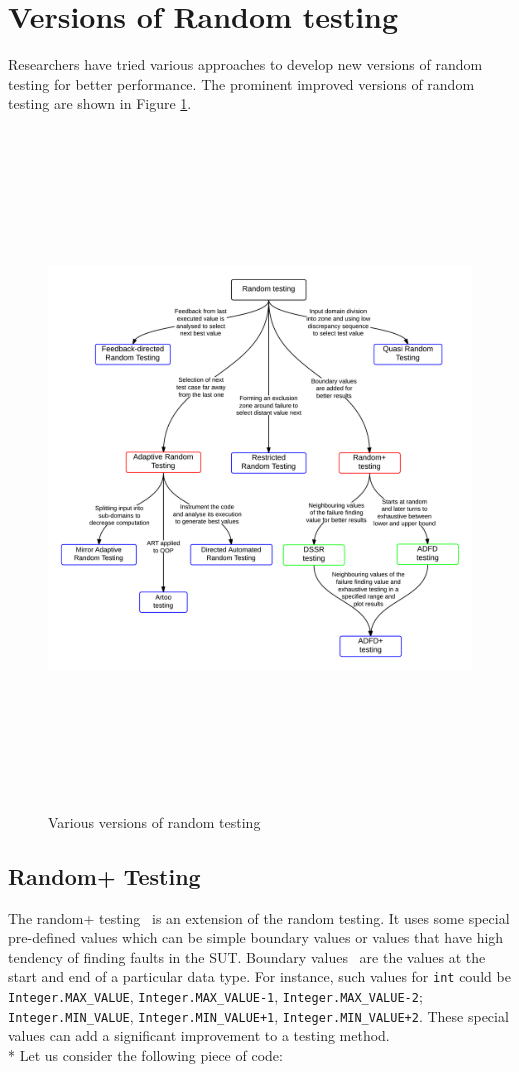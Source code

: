 \section{Versions of Random testing}
Researchers have tried various approaches to develop new versions of random testing for better performance. The prominent improved versions of random testing are shown in Figure \ref{fig:randomTestingVersions_2}.
\begin{figure}[H]
	\centering
	\centerline{\includegraphics[width=16.5cm, height=18cm]{chapter2/randomTestingVariations.png}}
	\caption{Various versions of random testing}
	\label{fig:randomTestingVersions_2}
\end{figure}

\subsection{Random+ Testing}
The random+ testing~\cite{leitner2007reconciling} is an extension of the random testing. It uses some special pre-defined values which can be simple boundary values or values that have high tendency of finding faults in the SUT. Boundary values~\cite{beizer2003software} are the values at the start and end of a particular data type. For instance, such values for \verb+int+ could be \verb+Integer.MAX_VALUE+, \verb+Integer.MAX_VALUE-1+, \verb+Integer.MAX_VALUE-2+; \verb+Integer.MIN_VALUE+, \verb-Integer.MIN_VALUE+1-, \verb-Integer.MIN_VALUE+2-. These special values can add a significant improvement to a testing method. \\*
Let us consider the following piece of code:


